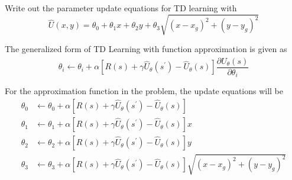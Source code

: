 \begin{exercise}[]{Write out the parameter update equations for TD learning with
    \begin{equation}
        \hat{U}(x,y)=\theta_0 +\theta_1 x + \theta_2 y + \theta_3 \sqrt{(x-x_g)^2+(y-y_g)^2}
    \end{equation}}
  \begin{solution}
  The generalized form of TD Learning with function approximation is given as
  \begin{equation}
    \theta_{i} \leftarrow \theta_{i}+\alpha\left[R(s)+\gamma \hat{U}_{\theta}\left(s^{\prime}\right)-\hat{U}_{\theta}(s)\right] \frac{\partial \hat{U}_{\theta}(s)}{\partial \theta_{i}}
  \end{equation}

  For the approximation function in the problem, the update equations will be
  \begin{equation}
      \begin{aligned}
          \theta_0 & \leftarrow \theta_0 + \alpha\left[R(s)+\gamma \hat{U}_{\theta}\left(s^{\prime}\right)-\hat{U}_{\theta}(s)\right]\\
          \theta_1 & \leftarrow \theta_1 +\alpha\left[R(s)+\gamma \hat{U}_{\theta}\left(s^{\prime}\right)-\hat{U}_{\theta}(s)\right] x\\
          \theta_2 & \leftarrow \theta_2 +\alpha\left[R(s)+\gamma \hat{U}_{\theta}\left(s^{\prime}\right)-\hat{U}_{\theta}(s)\right] y\\
          \theta_3 & \leftarrow \theta_3 +\alpha\left[R(s)+\gamma \hat{U}_{\theta}\left(s^{\prime}\right)-\hat{U}_{\theta}(s)\right] \sqrt{(x-x_g)^2+(y-y_g)^2}\\
      \end{aligned}
  \end{equation}
  \end{solution}
  \label{ex2}
\end{exercise}


